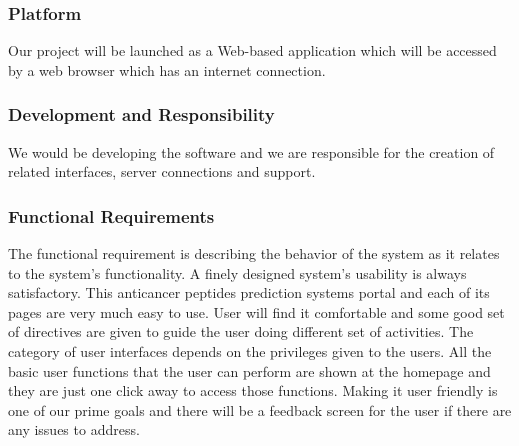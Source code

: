 \subsubsection{Platform}
Our project will be launched as a Web-based application which will be accessed by a web browser which has an internet connection.
\subsubsection{Development and Responsibility}
We would be developing the software and we are responsible for the creation of related interfaces, server connections and support.
\subsubsection{Functional Requirements}
The functional requirement is describing the behavior of the system as it relates to the system's functionality. A finely designed system's usability is always satisfactory. This anticancer peptides prediction systems portal and each of its pages are very much easy to use. User will find it comfortable and some good set of directives are given to guide the user doing different set of activities. The category of user interfaces depends on the privileges given to the users. All the basic user functions that the user can perform are shown at the homepage and they are just one click away to access those functions. Making it user friendly is one of our prime goals and there will be a feedback screen for the user if there are any issues to address.

